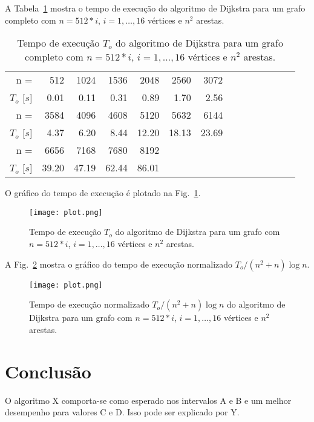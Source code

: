 \documentclass{article}
\begin{document}
A Tabela~\ref{tab1} mostra o tempo de execução do algoritmo de Dijkstra para um grafo completo com $n=512 * i$, $i=1,\ldots,16$ vértices e $n ^ 2$ arestas.


\begin{table}
  \centering
  \begin{tabular}{rrrrrrrrrrrrrr}
    \hline
    n =             & 512  & 1024 & 1536 & 2048 & 2560 & 3072        \\
    $T_o$ [$s$]     & 0.01 & 0.11 & 0.31 & 0.89 & 1.70 & 2.56     \\
    \hline
    n =             & 3584 & 4096  & 4608 & 5120  & 5632  & 6144  \\
    $T_o$ [$s$]     & 4.37 & 6.20  & 8.44 & 12.20 & 18.13 & 23.69 \\
    \hline
    n =             & 6656  & 7168  & 7680  & 8192  \\
    $T_o$ [$s$]     & 39.20 & 47.19 & 62.44 & 86.01 \\
    \hline
  \end{tabular}
  \caption{Tempo de execução $T_o$ do algoritmo de Dijkstra para um grafo completo com $n=512 * i$, $i=1,\ldots,16$ vértices e $n ^ 2$ arestas.}
  \label{tab1}
\end{table}

O gráfico do tempo de execução é plotado na Fig.~\ref{fig1}.

\begin{figure}
  \centering
  \texttt{[image: plot.png]}
  \caption{Tempo de execução $T_o$ do algoritmo de Dijkstra para um grafo com $n=512 * i$, $i=1,\ldots,16$ vértices e $n ^ 2$ arestas.}
  \label{fig1}
\end{figure}

A Fig.~\ref{fig2} mostra o gráfico do tempo de execução normalizado $T_o/(n^2+n)\log n$.

\begin{figure}
  \centering
  \texttt{[image: plot.png]}
  \caption{Tempo de execução normalizado $T_o/(n^2+n)\log n$ do algoritmo de Dijkstra para um grafo com $n=512 * i$, $i=1,\ldots,16$ vértices e $n ^ 2$ arestas.}
  \label{fig2}
\end{figure}

\section{Conclusão}

O algoritmo X comporta-se como esperado nos intervalos A e B e um melhor desempenho para valores C e D. Isso
pode ser explicado por Y.

\printbibliography
\end{document}
